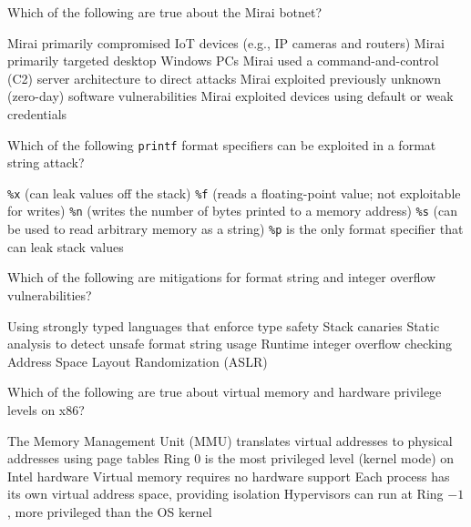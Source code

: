 \documentclass[addpoints]{exam}
\begin{document}
\begin{questions}
\question Which of the following are true about the Mirai botnet?

\begin{checkboxes}
  \CorrectChoice Mirai primarily compromised IoT devices (e.g., IP cameras and routers)
  \choice Mirai primarily targeted desktop Windows PCs
  \CorrectChoice Mirai used a command-and-control (C2) server architecture to direct attacks
  \choice Mirai exploited previously unknown (zero-day) software vulnerabilities
  \CorrectChoice Mirai exploited devices using default or weak credentials
\end{checkboxes}


\question Which of the following \texttt{printf} format specifiers can be exploited in a format string attack?

\begin{checkboxes}
  \CorrectChoice \texttt{\%x} (can leak values off the stack)
  \choice \texttt{\%f} (reads a floating-point value; not exploitable for writes)
  \CorrectChoice \texttt{\%n} (writes the number of bytes printed to a memory address)
  \CorrectChoice \texttt{\%s} (can be used to read arbitrary memory as a string)
  \choice \texttt{\%p} is the only format specifier that can leak stack values
\end{checkboxes}


\question Which of the following are mitigations for format string and integer overflow vulnerabilities?

\begin{checkboxes}
  \CorrectChoice Using strongly typed languages that enforce type safety
  \choice Stack canaries
  \CorrectChoice Static analysis to detect unsafe format string usage
  \CorrectChoice Runtime integer overflow checking
  \choice Address Space Layout Randomization (ASLR)
\end{checkboxes}



\question Which of the following are true about virtual memory and hardware privilege levels on x86?

\begin{checkboxes}
  \CorrectChoice The Memory Management Unit (MMU) translates virtual addresses to physical addresses using page tables
  \CorrectChoice Ring 0 is the most privileged level (kernel mode) on Intel hardware
  \choice Virtual memory requires no hardware support
  \CorrectChoice Each process has its own virtual address space, providing isolation
  \CorrectChoice Hypervisors can run at Ring $-1$, more privileged than the OS kernel
\end{checkboxes}




\end{questions}
\end{document}
